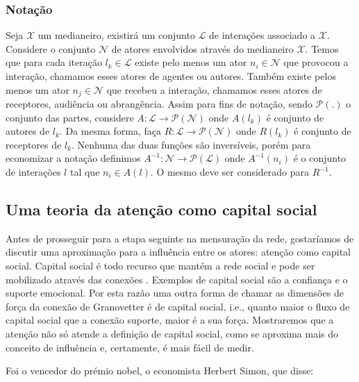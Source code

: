 \documentclass{article}
\begin{document}
\subsubsection{Notação}

Seja $\mathscr{X}$ um medianeiro, existirá um conjunto $\mathscr{L}$ de
interações associado a $\mathscr{X}$. Considere o conjunto $\mathscr{N}$ de
atores envolvidos através do medianeiro $\mathscr{X}$. Temos que para cada
iteração $l_k \in \mathscr{L}$ existe pelo menos um ator $n_i \in \mathscr{N}$
que provocou a interação, chamamos esses atores de agentes ou autores. Também
existe pelos menos um ator $n_j \in \mathscr{N}$ que recebeu a interação,
chamamos esses atores de receptores, audiência ou abrangência. Assim para fins de
notação, sendo $\mathscr{P}(.)$ o conjunto das partes, considere
$A:\mathscr{L}\to\mathscr{P}(\mathscr{N})$ onde $A(l_k)$ é conjunto de autores de
$l_k$. Da mesma forma, faça $R:\mathscr{L}\to\mathscr{P}(\mathscr{N})$ onde
$R(l_k)$ é conjunto de receptores de $l_k$. Nenhuma das duas funções são
inversíveis, porém para economizar a notação definimos
$A^{-1}:\mathscr{N}\to\mathscr{P}(\mathscr{L})$ onde $A^{-1}(n_i)$ é o conjunto
de interações $l$ tal que $n_i \in A(l)$. O mesmo deve ser considerado para
$R^{-1}$.

\subsection{Uma teoria da atenção como capital social}

Antes de prosseguir para a etapa seguinte na mensuração da rede, gostaríamos de
discutir uma aproximação para a influência entre os atores: atenção como
capital social. Capital social é todo recurso que mantém a rede social
\cite{Coleman1988} e pode ser mobilizado através das conexões
\cite{Gyarmati2004}. Exemplos de capital social são a confiança e o suporte
emocional. Por esta razão uma outra forma de chamar as dimensões de força da
conexão de Granovetter é de capital social, i.e., quanto maior o fluxo de
capital social que a conexão suporte, maior é a sua força. Mostraremos que a
atenção não só atende a definição de capital social, como se aproxima mais do
conceito de influência e, certamente, é mais fácil de medir.

Foi o vencedor do prémio nobel, o economista Herbert Simon, que disse:

\end{document}
